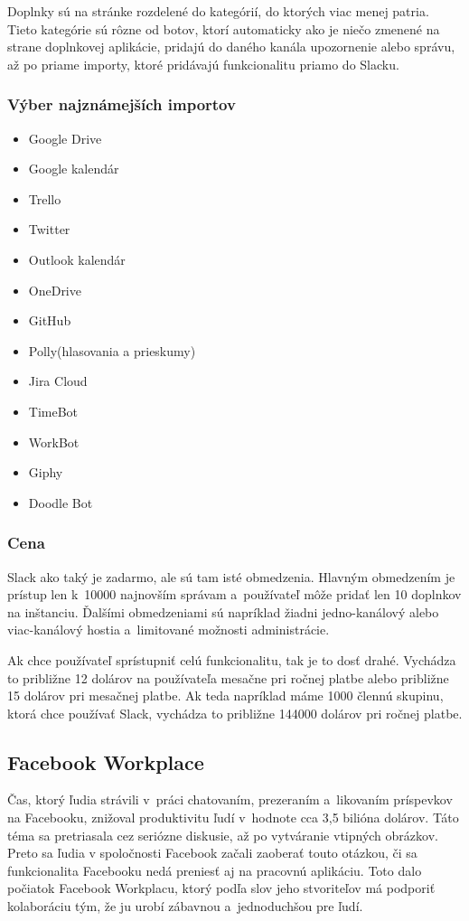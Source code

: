 \indent Doplnky sú na stránke rozdelené do kategórií, do ktorých viac menej patria. Tieto kategórie sú rôzne od botov, ktorí automaticky ako je niečo zmenené na strane doplnkovej aplikácie, pridajú do daného kanála upozornenie alebo správu, až po priame importy, ktoré pridávajú funkcionalitu priamo do Slacku.
\subsubsection{Výber najznámejších importov}
\begin{itemize}
    \item Google Drive
    \item Google kalendár
    \item Trello
    \item Twitter
    \item Outlook kalendár
    \item OneDrive
    \item GitHub
    \item Polly(hlasovania a prieskumy)
    \item Jira Cloud
    \item TimeBot
    \item WorkBot
    \item Giphy
    \item Doodle Bot
\end{itemize}
\subsubsection{Cena}
\indent Slack ako taký je zadarmo, ale sú tam isté obmedzenia. Hlavným obmedzením je prístup len k 10000 najnovším správam a používateľ môže pridať len 10 doplnkov na inštanciu. Ďalšími obmedzeniami sú napríklad žiadni jedno-kanálový alebo viac-kanálový hostia a limitované možnosti administrácie. 

\indent Ak chce používateľ sprístupniť celú funkcionalitu, tak je to dosť drahé. Vychádza to približne 12 dolárov na používateľa mesačne pri ročnej platbe alebo približne 15 dolárov pri mesačnej platbe. Ak teda napríklad máme 1000 člennú skupinu, ktorá chce používať Slack, vychádza to približne 144000 dolárov pri ročnej platbe\cite{slack}.

\subsection{Facebook Workplace}
\indent Čas, ktorý ľudia strávili v práci chatovaním, prezeraním a likovaním príspevkov na Facebooku, znižoval produktivitu ľudí v hodnote cca 3,5 bilióna dolárov. Táto téma sa pretriasala cez seriózne diskusie, až po vytváranie vtipných obrázkov. Preto sa ľudia v spoločnosti Facebook začali zaoberať touto otázkou, či sa funkcionalita Facebooku nedá preniesť aj na pracovnú aplikáciu. Toto dalo počiatok Facebook Workplacu, ktorý podľa slov jeho stvoriteľov má podporiť kolaboráciu tým, že ju urobí zábavnou a jednoduchšou pre ľudí\cite{facebook_workplace,facebook_workplace_2}.

